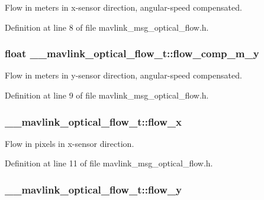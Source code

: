 Flow in meters in x-\/sensor direction, angular-\/speed compensated. 



Definition at line 8 of file mavlink\-\_\-msg\-\_\-optical\-\_\-flow.\-h.

\hypertarget{struct____mavlink__optical__flow__t_a2e39bcd7b74a5c660d1684c8e44e2cca}{
\subsubsection[{flow\-\_\-comp\-\_\-m\-\_\-y}]{\setlength{\rightskip}{0pt plus 5cm}float \-\_\-\-\_\-mavlink\-\_\-optical\-\_\-flow\-\_\-t\-::flow\-\_\-comp\-\_\-m\-\_\-y}}\label{struct____mavlink__optical__flow__t_a2e39bcd7b74a5c660d1684c8e44e2cca}


Flow in meters in y-\/sensor direction, angular-\/speed compensated. 



Definition at line 9 of file mavlink\-\_\-msg\-\_\-optical\-\_\-flow.\-h.

\hypertarget{struct____mavlink__optical__flow__t_a1e1332d4eb9a84f38d32af8f32ed8c10}{
\subsubsection[{flow\-\_\-x}]{ \-\_\-\-\_\-mavlink\-\_\-optical\-\_\-flow\-\_\-t\-::flow\-\_\-x}}\label{struct____mavlink__optical__flow__t_a1e1332d4eb9a84f38d32af8f32ed8c10}


Flow in pixels in x-\/sensor direction. 



Definition at line 11 of file mavlink\-\_\-msg\-\_\-optical\-\_\-flow.\-h.

\hypertarget{struct____mavlink__optical__flow__t_aaf2884728b3ae06ec464c9cf2f8ce1c2}{
\subsubsection[{flow\-\_\-y}]{ \-\_\-\-\_\-mavlink\-\_\-optical\-\_\-flow\-\_\-t\-::flow\-\_\-y}}\label{struct____mavlink__optical__flow__t_aaf2884728b3ae06ec464c9cf2f8ce1c2}


